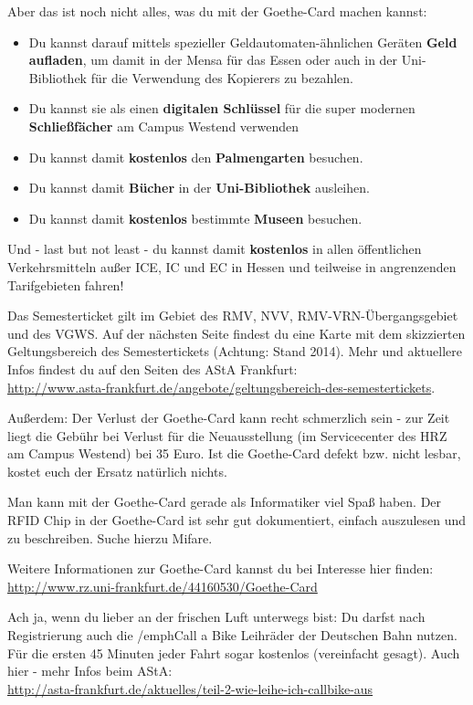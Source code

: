 Aber das ist noch nicht alles, was du mit der Goethe-Card machen kannst:

\begin{itemize}
	\item Du kannst darauf mittels spezieller Geldautomaten-ähnlichen Geräten \textbf{Geld aufladen}, um damit in der Mensa für das Essen oder auch in der Uni-Bibliothek für die Verwendung des Kopierers zu bezahlen.
	\item Du kannst sie als einen \textbf{digitalen Schlüssel} für die super modernen \textbf{Schließfächer} am Campus Westend verwenden
	\item Du kannst damit \textbf{kostenlos} den \textbf{Palmengarten} besuchen.
	\item Du kannst damit \textbf{Bücher} in der \textbf{Uni-Bibliothek} ausleihen.
	\item Du kannst damit \textbf{kostenlos} bestimmte \textbf{Museen} besuchen.
\end{itemize}

Und - last but not least - du kannst damit \textbf{kostenlos} in allen öffentlichen Verkehrsmitteln außer ICE, IC und EC in Hessen und teilweise in angrenzenden Tarifgebieten fahren! 

Das Semesterticket gilt im Gebiet des RMV, NVV, RMV-VRN-Übergangsgebiet und des VGWS. Auf der nächsten Seite findest du eine Karte mit dem skizzierten Geltungsbereich des Semestertickets (Achtung: Stand 2014). Mehr und aktuellere Infos findest du auf den Seiten des AStA Frankfurt:\\
\url{http://www.asta-frankfurt.de/angebote/geltungsbereich-des-semestertickets}.

Au{\ss}erdem: Der Verlust der Goethe-Card kann recht schmerzlich sein - zur Zeit liegt die Gebühr bei Verlust für die Neuausstellung (im Servicecenter des HRZ am Campus Westend) bei 35 Euro. Ist die Goethe-Card defekt bzw. nicht lesbar, kostet euch der Ersatz natürlich nichts.

Man kann mit der Goethe-Card gerade als Informatiker viel Spa{\ss} haben. Der RFID Chip in der Goethe-Card ist sehr gut dokumentiert, einfach auszulesen und zu beschreiben. Suche hierzu Mifare. 

Weitere Informationen zur Goethe-Card kannst du bei Interesse hier finden:\\
\url{http://www.rz.uni-frankfurt.de/44160530/Goethe-Card}

Ach ja, wenn du lieber an der frischen Luft unterwegs bist: Du darfst nach Registrierung auch die /emph{Call a Bike} Leihräder der Deutschen Bahn nutzen. Für die ersten 45 Minuten jeder Fahrt sogar kostenlos (vereinfacht gesagt). Auch hier - mehr Infos beim AStA:\\
\url{http://asta-frankfurt.de/aktuelles/teil-2-wie-leihe-ich-callbike-aus}